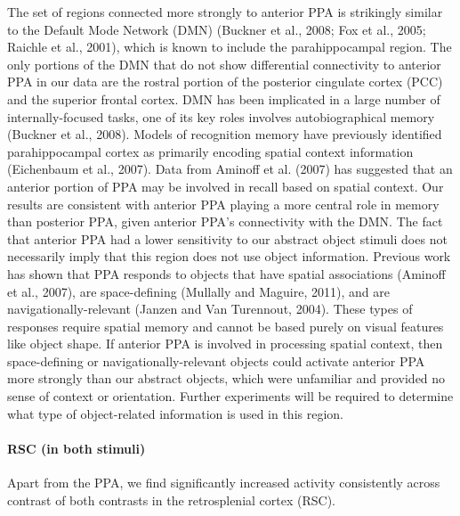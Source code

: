 \documentclass[english]{article}
\begin{document}
The set of regions connected more strongly to anterior PPA is strikingly similar
to the Default Mode Network (DMN) (Buckner et al., 2008; Fox et al., 2005;
Raichle et al., 2001), which is known to include the parahippocampal region. The
only portions of the DMN that do not show differential connectivity to anterior
PPA in our data are the rostral portion of the posterior cingulate cortex (PCC)
and the superior frontal cortex.
DMN has been implicated in a large number of internally-focused
tasks, one of its key roles involves autobiographical memory (Buckner et al.,
2008). Models of recognition memory have previously identified parahippocampal
cortex as primarily encoding spatial context information (Eichenbaum et al.,
2007). Data from Aminoff et al. (2007) has suggested that an anterior
portion of PPA may be involved in recall based on spatial context. Our results
are consistent with anterior PPA playing a more central role in memory than
posterior PPA, given anterior PPA's connectivity with the DMN.
%
The fact that anterior PPA had a lower sensitivity to our abstract object
stimuli does not necessarily imply that this region does not use object
information. Previous work has shown that PPA responds to objects that have
spatial associations (Aminoff et al., 2007), are space-defining (Mullally and
Maguire, 2011), and are navigationally-relevant (Janzen and Van Turennout,
2004). These types of responses require spatial memory and cannot be based
purely on visual features like object shape. If anterior PPA is involved in
processing spatial context, then space-defining or navigationally-relevant
objects could activate anterior PPA more strongly than our abstract objects,
which were unfamiliar and provided no sense of context or orientation. Further
experiments will be required to determine what type of object-related
information is used in this region.



\paragraph{RSC (in both stimuli)}


Apart from the PPA, we find significantly increased activity consistently across
contrast of both contrasts in the retrosplenial cortex (RSC).
\end{document}
